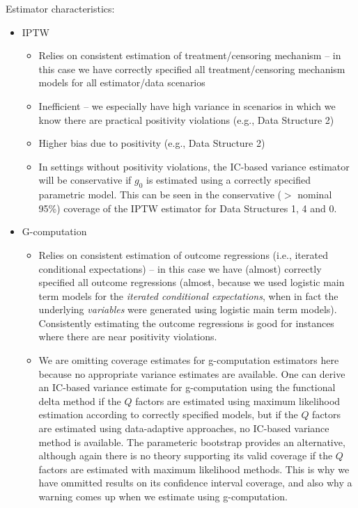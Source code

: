 \documentclass{exam}
\begin{document}
\begin{solution}
Estimator characteristics:
\begin{itemize}
\item IPTW
\begin{itemize}
\item Relies on consistent estimation of treatment/censoring mechanism -- in this case we have correctly specified all treatment/censoring mechanism models for all estimator/data scenarios
\item Inefficient -- we especially have high variance in scenarios in which we know there are practical positivity violations (e.g., Data Structure 2)
\item Higher bias due to positivity (e.g., Data Structure 2)
\item In settings without positivity violations, the IC-based variance estimator will be conservative if $g_0$ is estimated using a correctly specified parametric model. This can be seen in the conservative ($>$ nominal 95\%) coverage of the IPTW estimator for Data Structures 1, 4 and 0.
\end{itemize}
\item G-computation
\begin{itemize}
\item Relies on consistent estimation of outcome regressions (i.e., iterated conditional expectations) -- in this case we have (almost) correctly specified all outcome regressions (almost, because we used logistic main term models for the \textit{iterated conditional expectations}, when in fact the underlying \textit{variables} were generated using logistic main term models). Consistently estimating the outcome regressions is good for instances where there are near positivity violations.
\item We are omitting coverage estimates for g-computation estimators here because no appropriate variance estimates are available. One can derive an IC-based variance estimate for g-computation using the functional delta method if the $Q$ factors are estimated using maximum likelihood estimation according to correctly specified models, but if the $Q$ factors are estimated using data-adaptive approaches, no IC-based variance method is available. The parameteric bootstrap provides an alternative, although again there is no theory supporting its valid coverage if the $Q$ factors are estimated with maximum likelihood methods. This is why we have ommitted results on its confidence interval coverage, and also why a warning comes up when we estimate using g-computation.

\end{itemize}
\end{itemize}
\end{solution}
\end{document}
